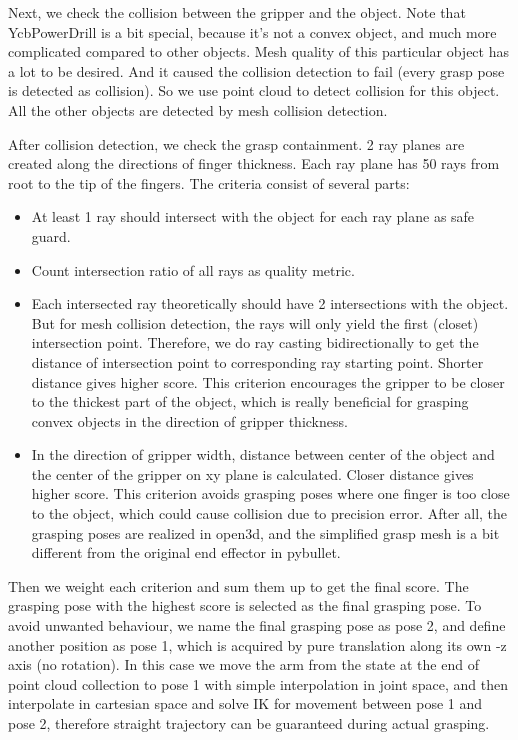 \documentclass[
	english,
	accentcolor=11d,%
	type=intern,
	marginpar=false,
    logofile=media/PEARLTUDA.png
	]{tudapub}
\begin{document}
Next, we check the collision between the gripper and the object. Note that YcbPowerDrill is a bit special, because it's not a convex object, and much more complicated compared to other objects. Mesh quality of this particular object has a lot to be desired. And it caused the collision detection to fail (every grasp pose is detected as collision). So we use point cloud to detect collision for this object. All the other objects are detected by mesh collision detection.

After collision detection, we check the grasp containment. 2 ray planes are created along the directions of finger thickness. Each ray plane has 50 rays from root to the tip of the fingers. The criteria consist of several parts:

\begin{itemize}
\item At least 1 ray should intersect with the object for each ray plane as safe guard.
\item Count intersection ratio of all rays as quality metric.
\item Each intersected ray theoretically should have 2 intersections with the object. But for mesh collision detection, the rays will only yield the first (closet) intersection point. Therefore, we do ray casting bidirectionally to get the distance of intersection point to corresponding ray starting point. Shorter distance gives higher score. This criterion encourages the gripper to be closer to the thickest part of the object, which is really beneficial for grasping convex objects in the direction of gripper thickness.
\item In the direction of gripper width, distance between center of the object and the center of the gripper on xy plane is calculated. Closer distance gives higher score. This criterion avoids grasping poses where one finger is too close to the object, which could cause collision due to precision error. After all, the grasping poses are realized in open3d, and the simplified grasp mesh is a bit different from the original end effector in pybullet.
\end{itemize}

Then we weight each criterion and sum them up to get the final score. The grasping pose with the highest score is selected as the final grasping pose. To avoid unwanted behaviour, we name the final grasping pose as pose 2, and define another position as pose 1, which is acquired by pure translation along its own -z axis (no rotation). In this case we move the arm from the state at the end of point cloud collection to pose 1 with simple interpolation in joint space, and then interpolate in cartesian space and solve IK for movement between pose 1 and pose 2, therefore straight trajectory can be guaranteed during actual grasping.
\end{document}
